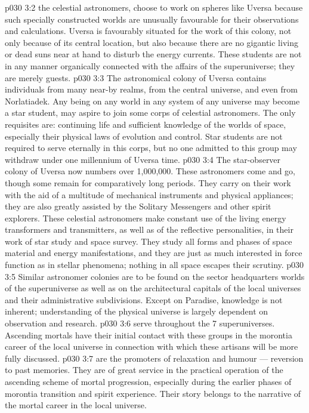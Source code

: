 \vs p030 3:2 \bibnobreakspace {} the celestial astronomers, choose to work on spheres like Uversa because such specially constructed worlds are unusually favourable for their observations and calculations. Uversa is favourably situated for the work of this colony, not only because of its central location, but also because there are no gigantic living or dead suns near at hand to disturb the energy currents. These students are not in any manner organically connected with the affairs of the superuniverse; they are merely guests.
\vs p030 3:3 The astronomical colony of Uversa contains individuals from many near\hyp{}by realms, from the central universe, and even from Norlatiadek. Any being on any world in any system of any universe may become a star student, may aspire to join some corps of celestial astronomers. The only requisites are: continuing life and sufficient knowledge of the worlds of space, especially their physical laws of evolution and control. Star students are not required to serve eternally in this corps, but no one admitted to this group may withdraw under one millennium of Uversa time.
\vs p030 3:4 The star\hyp{}observer colony of Uversa now numbers over 1,000,000. These astronomers come and go, though some remain for comparatively long periods. They carry on their work with the aid of a multitude of mechanical instruments and physical appliances; they are also greatly assisted by the Solitary Messengers and other spirit explorers. These celestial astronomers make constant use of the living energy transformers and transmitters, as well as of the reflective personalities, in their work of star study and space survey. They study all forms and phases of space material and energy manifestations, and they are just as much interested in force function as in stellar phenomena; nothing in all space escapes their scrutiny.
\vs p030 3:5 Similar astronomer colonies are to be found on the sector headquarters worlds of the superuniverse as well as on the architectural capitals of the local universes and their administrative subdivisions. Except on Paradise, knowledge is not inherent; understanding of the physical universe is largely dependent on observation and research.
\vs p030 3:6 \bibnobreakspace {} serve throughout the 7 superuniverses. Ascending mortals have their initial contact with these groups in the morontia career of the local universe in connection with which these artisans will be more fully discussed.
\vs p030 3:7 \bibnobreakspace {} are the promoters of relaxation and humour --- reversion to past memories. They are of great service in the practical operation of the ascending scheme of mortal progression, especially during the earlier phases of morontia transition and spirit experience. Their story belongs to the narrative of the mortal career in the local universe.
